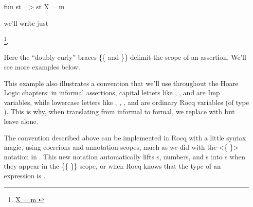 \documentclass[12pt]{report}
\begin{document}
      fun st => st X = m


    we'll write just


      \footnote{\url{ X = m }}.


 Here the ``doubly curly'' braces \{\{ and \}\} delimit
    the scope of an assertion.  We'll see more examples below. 

 This example also illustrates a convention that we'll use
    throughout the Hoare Logic chapters: in informal assertions,
    capital letters like , , and  are Imp variables, while
    lowercase letters like , , , and  are ordinary Rocq
    variables (of type ).  This is why, when translating from
    informal to formal, we replace  with   but leave 
    alone.


    The convention described above can be implemented in Rocq with a
    little syntax magic, using coercions and annotation scopes, much
    as we did with the <\{  \}> notation in . This new
    notation automatically lifts s, numbers, and s into
    s when they appear in the \{\{ \coqdocvar{\_} \}\} scope, or when Rocq
    knows that the type of an expression is .
\end{document}
